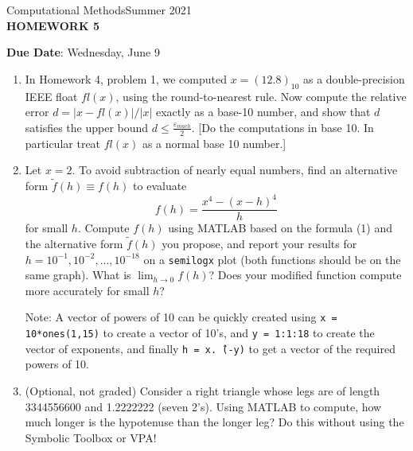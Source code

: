 \documentclass[12pt]{article}
\begin{document}
\begin{center}
Computational Methods\qquad Summer 2021
\\

\textbf{\large HOMEWORK 5}\\
\end{center}
\noindent \textbf{Due Date}: Wednesday, June 9\\

\begin{enumerate}
\item In Homework 4, problem 1, we computed $x = (12.8)_{10}$ as a double-precision IEEE float $fl(x)$, using the round-to-nearest rule. Now compute the relative error $d=|x-fl(x)|/|x|$ exactly as a base-10 number, and show that $d$ satisfies the upper bound $d\le \displaystyle{\frac{\varepsilon_{mach}}{2}}$. [Do the computations in base 10. In particular treat $fl(x)$ as a normal base 10 number.]
\item Let $x = 2$. To avoid subtraction of nearly equal numbers, find an alternative form $\widetilde{f}(h) \equiv f(h)$ to evaluate 
\begin{equation}
f(h) = \frac{x^4-(x-h)^4}{h}
\end{equation}
for small $h$. Compute $f(h)$ using MATLAB based on the formula (1) and the alternative form $\widetilde{f}(h)$ you propose, and report your results for $h=10^{-1},10^{-2},...,10^{-18}$ on a \texttt{semilogx} plot (both functions should be on the same graph). What is $\lim_{h\rightarrow 0}f(h)$? Does your modified function compute more accurately for small $h$? 

Note: A vector of powers of 10 can be quickly created using \texttt{x = 10*ones(1,15)} to create a vector of 10's, and \texttt{y = 1:1:18} to create the vector of exponents, and finally \texttt{h = x.\^\,(-y)} to get a vector of the required powers of 10.

\item (Optional, not graded) Consider a right triangle whose legs are of length 3344556600 and 1.2222222 (seven 2's). Using MATLAB to compute, how much longer is the hypotenuse than the longer leg? Do this without using the Symbolic Toolbox or VPA!
\end{enumerate}
\end{document}
